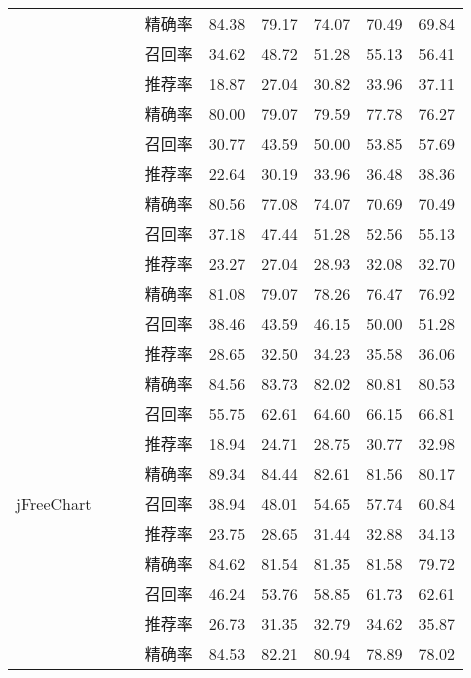 \begin{table}
\begin{tabular}{cccccccc}
             &  &精确率 & 84.38 & 79.17 & 74.07 & 70.49 & 69.84 \\
             & & 召回率 & 34.62 & 48.72 & 51.28 & 55.13 & 56.41 \\
\cline{2-8}
&~\multirow{3}{*}{无Code组(\%)}    
\ & 推荐率 & 18.87 & 27.04 & 30.82 & 33.96 & 37.11 \\
             &  &精确率 & 80.00 & 79.07 & 79.59 & 77.78 & 76.27 \\
             &  &召回率 & 30.77 & 43.59 & 50.00 & 53.85 & 57.69 \\
\cline{2-8}
&~\multirow{3}{*}{无Context组   (\%)}    
& 推荐率 & 22.64 & 30.19 & 33.96 & 36.48 & 38.36 \\
             &  &精确率 & 80.56 & 77.08 & 74.07 & 70.69 & 70.49 \\
             &  &召回率 & 37.18 & 47.44 & 51.28 & 52.56 & 55.13 \\
\cline{2-8}
&~\multirow{3}{*}{无Evolution组(\%)}    
& 推荐率 & 23.27 & 27.04 & 28.93 & 32.08 & 32.70 \\
             &  &精确率 & 81.08 & 79.07 & 78.26 & 76.47 & 76.92 \\
             &  &召回率 & 38.46 & 43.59 & 46.15 & 50.00 & 51.28 \\
\hline
\multirow{12}{*}{jFreeChart}
&~\multirow{3}{*}{全部组(\%) }
& 推荐率 & 28.65 & 32.50 & 34.23 & 35.58 & 36.06 \\
             &  &精确率 & 84.56 & 83.73 & 82.02 & 80.81 & 80.53 \\
             &  &召回率 & 55.75 & 62.61 & 64.60 & 66.15 & 66.81 \\
\cline{2-8}
&~\multirow{3}{*}{无Code组(\%)}    
 & 推荐率 & 18.94 & 24.71 & 28.75 & 30.77 & 32.98 \\
             &  &精确率 & 89.34 & 84.44 & 82.61 & 81.56 & 80.17 \\
             &  &召回率 & 38.94 & 48.01 & 54.65 & 57.74 & 60.84 \\
\cline{2-8}
&~\multirow{3}{*}{无Context组   (\%)}    
& 推荐率 & 23.75 & 28.65 & 31.44 & 32.88 & 34.13 \\
             &  &精确率 & 84.62 & 81.54 & 81.35 & 81.58 & 79.72 \\
             &  &召回率 & 46.24 & 53.76 & 58.85 & 61.73 & 62.61 \\
\cline{2-8}
&~\multirow{3}{*}{无Evolution组(\%)}    
& 推荐率 & 26.73 & 31.35 & 32.79 & 34.62 & 35.87 \\
             &  &精确率 & 84.53 & 82.21 & 80.94 & 78.89 & 78.02 \\

\end{tabular}
\end{table}
